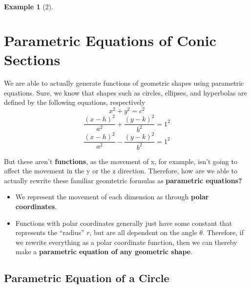 \documentclass{report}
\newtheorem*{remark*}{Example}
\begin{document}
\begin{sloppypar}
\begin{remark*}[2]
\end{remark*}

\section{Parametric Equations of Conic Sections}%
\label{sec:label}
We are able to actually generate functions
of geometric shapes using parametric equations.
Sure, we know that shapes such as circles, ellipses,
and hyperbolas are defined by the following equations,
respectively
\[ x^{2} + y^{2} = c^{2}\]
\[ \frac{(x-h)^{2}}{a^{2}}+\frac{(y-k)^{2}}{b^{2}} = 1^{2}\]
\[ \frac{(x-h)^{2}}{a^{2}}-\frac{(y-k)^{2}}{b^{2}} = 1^{2}\]

But these aren't \textbf{functions}, as the movement of
x, for example, isn't going to affect the movement in the
y or the z direction. Therefore, how are we able
to actually rewrite these familiar geomtetric formulas
as \textbf{parametric equations?}
\begin{itemize}
  \item We represent the movement of each
        dimension as through
        \textbf{polar coordinates}.
  \item Functions with polar coordinates
        generally just have some constant
        that represents the ``radius'' $ r $,
        but are all dependent on the
        angle $ \theta $. Therefore,
        if we rewrite everything as a
        polar coordinate function, then
        we can thereby make a
        \textbf{parametric equation
        of any geometric shape}.
\end{itemize}

\subsection{Parametric Equation of a Circle}
\begin{center}
\end{center}


\end{sloppypar}
\end{document}
